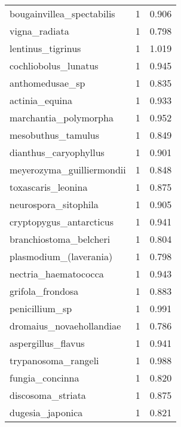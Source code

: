 \begin{tabular}{lrr}
      bougainvillea\_spectabilis &                   1 &     0.906 \\
                  vigna\_radiata &                   1 &     0.798 \\
              lentinus\_tigrinus &                   1 &     1.019 \\
           cochliobolus\_lunatus &                   1 &     0.945 \\
                anthomedusae\_sp &                   1 &     0.835 \\
                 actinia\_equina &                   1 &     0.933 \\
          marchantia\_polymorpha &                   1 &     0.952 \\
             mesobuthus\_tamulus &                   1 &     0.849 \\
          dianthus\_caryophyllus &                   1 &     0.901 \\
      meyerozyma\_guilliermondii &                   1 &     0.848 \\
             toxascaris\_leonina &                   1 &     0.875 \\
           neurospora\_sitophila &                   1 &     0.905 \\
        cryptopygus\_antarcticus &                   1 &     0.941 \\
         branchiostoma\_belcheri &                   1 &     0.804 \\
         plasmodium\_(laverania) &                   1 &     0.798 \\
           nectria\_haematococca &                   1 &     0.943 \\
               grifola\_frondosa &                   1 &     0.883 \\
                 penicillium\_sp &                   1 &     0.991 \\
       dromaius\_novaehollandiae &                   1 &     0.786 \\
             aspergillus\_flavus &                   1 &     0.941 \\
            trypanosoma\_rangeli &                   1 &     0.988 \\
                fungia\_concinna &                   1 &     0.820 \\
              discosoma\_striata &                   1 &     0.875 \\
               dugesia\_japonica &                   1 &     0.821 \\

\end{tabular}

